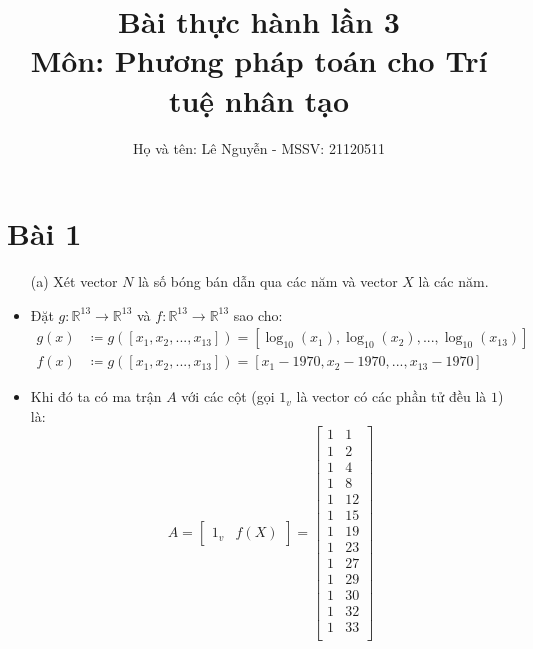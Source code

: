 \documentclass[a4paper, 12pt]{report}
\title{\textbf{Bài thực hành lần 3} \\[5pt] Môn: Phương pháp toán cho Trí tuệ nhân tạo}
\author{Họ và tên: Lê Nguyễn - MSSV: 21120511}
\begin{document}
\maketitle
\setcounter{chapter}{1}
\tableofcontents
\newpage

\section{Bài 1}

\begin{itemize}
    \item[(a)] Xét vector $N$ là số bóng bán dẫn qua các năm và vector $X$ là các năm.

    \item Đặt $g: \mathbb{R}^{13} \to \mathbb{R}^{13}$ và $f: \mathbb{R}^{13} \to \mathbb{R}^{13}$ sao cho:
    $$
    \begin{aligned}
    g(x) &\coloneqq g([x_1, x_2, ..., x_{13}]) = [\log_{10}(x_1), \log_{10}(x_2), ..., \log_{10}(x_{13})] \\
    f(x) &\coloneqq g([x_1, x_2, ..., x_{13}]) = [x_1 - 1970, x_2 - 1970, ..., x_{13} - 1970] 
    \end{aligned}
    $$

    \item Khi đó ta có ma trận $A$ với các cột (gọi $1_v$ là vector có các phần tử đều là $1$) là:
    $$
    A = \begin{bmatrix}
        1_v & f(X) 
    \end{bmatrix} = \begin{bmatrix}
        1 & 1 \\
        1 & 2 \\
        1 & 4 \\
        1 & 8 \\
        1 & 12 \\
        1 & 15 \\
        1 & 19 \\
        1 & 23 \\
        1 & 27 \\
        1 & 29 \\
        1 & 30 \\
        1 & 32 \\
        1 & 33 \\
    \end{bmatrix}
    $$


\end{itemize}
\end{document}
